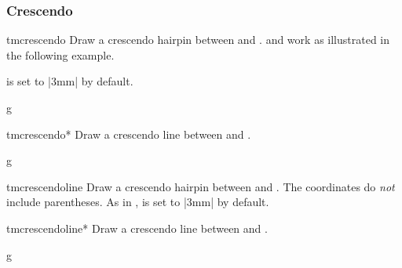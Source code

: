 \documentclass[11pt,a4paper]{ltxdoc}
\begin{document}
\subsubsection{Crescendo}\label{sec:line:cresc-dim:cresc}
\begin{docCommand}{tmcrescendo}{}
  Draw a crescendo hairpin between  and .  
  and  work as illustrated in the following example.

   is set to |3mm| by default.
\end{docCommand}
\begin{dispExample}
\begin{tmsinglestaff}
  \begin{tmstaff}{g}
      
      
  \end{tmstaff}
\end{tmsinglestaff}
\end{dispExample}
\begin{docCommand}{tmcrescendo*}{}
  Draw a crescendo line between  and .
\end{docCommand}
\begin{dispExample}
\begin{tmsinglestaff}
  \begin{tmstaff}{g}
      
      
  \end{tmstaff}
\end{tmsinglestaff}
\end{dispExample}
\begin{docCommand}{tmcrescendoline}{}
  Draw a crescendo hairpin between  and . 
  The coordinates do \emph{not} include parentheses.
  As in ,  is set to |3mm| by default.
\end{docCommand}
\begin{docCommand}{tmcrescendoline*}{}
  Draw a crescendo line between  and .
\end{docCommand}
\begin{dispExample}
\begin{tmsinglestaff}
  \begin{tmstaff}{g}
  \end{tmstaff}
\end{tmsinglestaff}
\end{dispExample}
\end{document}
